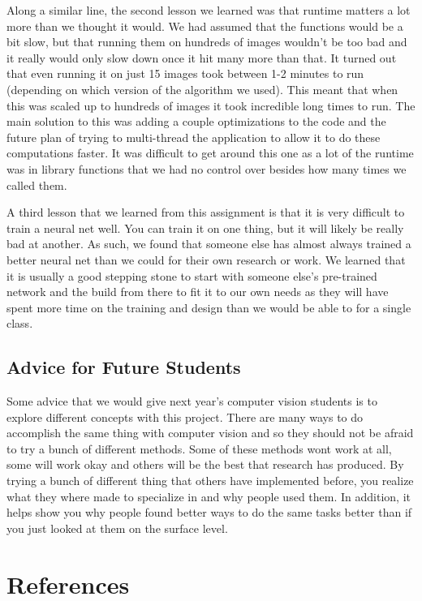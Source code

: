 \documentclass[12pt]{article}
\begin{document}
	Along a similar line, the second lesson we learned was that runtime matters a lot more than we thought it would. We had assumed that the functions would be a bit slow, but that running them on hundreds of images wouldn't be too bad and it really would only slow down once it hit many more than that. It turned out that even running it on just 15 images took between 1-2 minutes to run (depending on which version of the algorithm we used). This meant that when this was scaled up to hundreds of images it took incredible long times to run. The main solution to this was adding a couple optimizations to the code and the future plan of trying to multi-thread the application to allow it to do these computations faster. It was difficult to get around this one as a lot of the runtime was in library functions that we had no control over besides how many times we called them.
	
	A third lesson that we learned from this assignment is that it is very difficult to train a neural net well. You can train it on one thing, but it will likely be really bad at another. As such, we found that someone else has almost always trained a better neural net than we could for their own research or work. We learned that it is usually a good stepping stone to start with someone else's pre-trained network and the build from there to fit it to our own needs as they will have spent more time on the training and design than we would be able to for a single class.

\subsection{Advice for Future Students}
	Some advice that we would give next year's computer vision students is to explore different concepts with this project. There are many ways to do accomplish the same thing with computer vision and so they should not be afraid to try a bunch of different methods. Some of these methods wont work at all, some will work okay and others will be the best that research has produced. By trying a bunch of different thing that others have implemented before, you realize what they where made to specialize in and why people used them. In addition, it helps show you why people found better ways to do the same tasks better than if you just looked at them on the surface level.


\section*{References}
\end{document}
